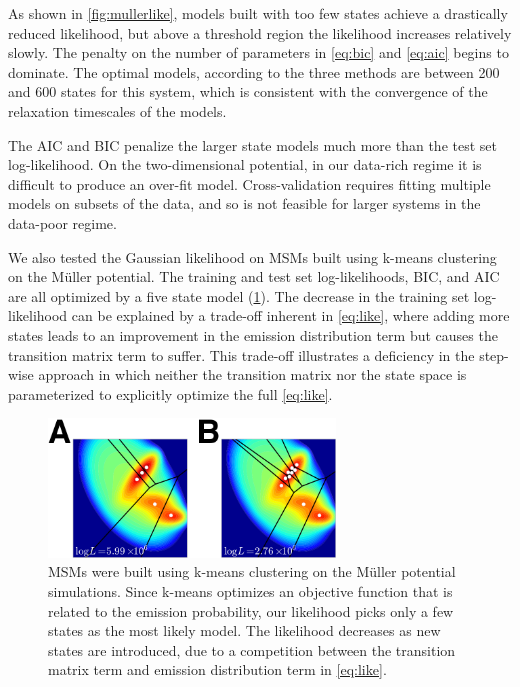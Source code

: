 \documentclass[journal=jpcbfk, layout=traditional, manuscript=article]{achemso}
\begin{document}
As shown in \cref{fig:mullerlike}, models built with too few states achieve a drastically reduced likelihood, but above a threshold region the likelihood increases relatively slowly. The penalty on the number of parameters in \cref{eq:bic} and \cref{eq:aic} begins to dominate. The optimal models, according to the three methods are between 200 and 600 states for this system, which is consistent with the convergence of the relaxation timescales of the models. 

The AIC and BIC penalize the larger state models much more than the test set log-likelihood. On the two-dimensional potential, in our data-rich regime it is difficult to produce an over-fit model. Cross-validation requires fitting multiple models on subsets of the data, and so is not feasible for larger systems in the data-poor regime.

We also tested the Gaussian likelihood on MSMs built using k-means clustering on the M\"uller potential. The training and test set log-likelihoods, BIC, and AIC are all optimized by a five state model (\cref{fig:kmeans_mull}). The decrease in the training set log-likelihood can be explained by a trade-off inherent in \cref{eq:like}, where adding more states leads to an improvement in the emission distribution term but causes the transition matrix term to suffer. This trade-off illustrates a deficiency in the step-wise approach in which neither the transition matrix nor the state space is parameterized to explicitly optimize the full \cref{eq:like}.

\begin{figure}
\centering
\includegraphics[width=3in]{figs_final/kmeans_like2_lbl.png}
\caption{MSMs were built using k-means clustering on the M\"uller potential simulations. Since k-means optimizes an objective function that is related to the emission probability, our likelihood picks only a few states as the most likely model. The likelihood decreases as new states are introduced, due to a competition between the transition matrix term and emission distribution term in \cref{eq:like}.}
\label{fig:kmeans_mull}
\end{figure}
\end{document}
